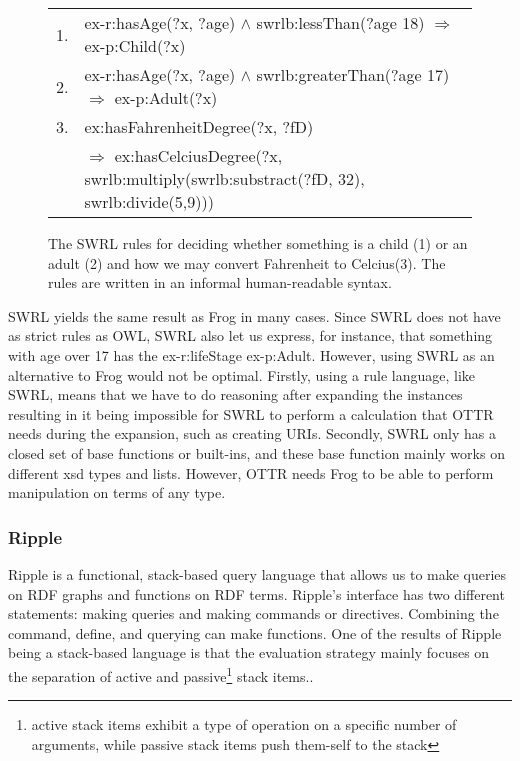 \begin{figure}
    \begin{tabular}[ht!]{c l}
        1. & ex-r:hasAge(?x, ?age) $\wedge$ swrlb:lessThan(?age 18) $\Rightarrow$ ex-p:Child(?x) \\
        2. & ex-r:hasAge(?x, ?age) $\wedge$ swrlb:greaterThan(?age 17) $\Rightarrow$ ex-p:Adult(?x) \\
        3. & ex:hasFahrenheitDegree(?x, ?fD) \\
        & $\Rightarrow$ ex:hasCelciusDegree(?x, swrlb:multiply(swrlb:substract(?fD, 32), swrlb:divide(5,9)))\\
    \end{tabular}
    \caption{The SWRL rules for deciding whether something is a child (1) or an adult (2) and how we may convert Fahrenheit to Celcius(3). The rules are written in an informal human-readable syntax\autocite{SWRL}.}
    \label{fig:SWRL-example}
\end{figure}

\para
SWRL yields the same result as Frog in many cases. Since SWRL does not have as strict rules as OWL, SWRL also let us express, for instance, that something with age over 17 has the ex-r:lifeStage ex-p:Adult. However, using SWRL as an alternative to Frog would not be optimal. Firstly, using a rule language, like SWRL, means that we have to do reasoning after expanding the instances resulting in it being impossible for SWRL to perform a calculation that OTTR needs during the expansion, such as creating URIs. Secondly, SWRL only has a closed set of base functions or built-ins, and these base function mainly works on different xsd types and lists. However, OTTR needs Frog to be able to perform manipulation on terms of any type.

\subsubsection{Ripple}
Ripple is a functional, stack-based query language that allows us to make queries on RDF graphs and functions on RDF terms. Ripple's interface has two different statements: making queries and making commands or directives. Combining the command, define, and querying can make functions. One of the results of Ripple being a stack-based language is that the evaluation strategy mainly focuses on the separation of active and passive\footnote{active stack items exhibit a type of operation on a specific number of arguments, while passive stack items push them-self to the stack} stack items.\autocite{ShinavierJoshua_FPLD}.

